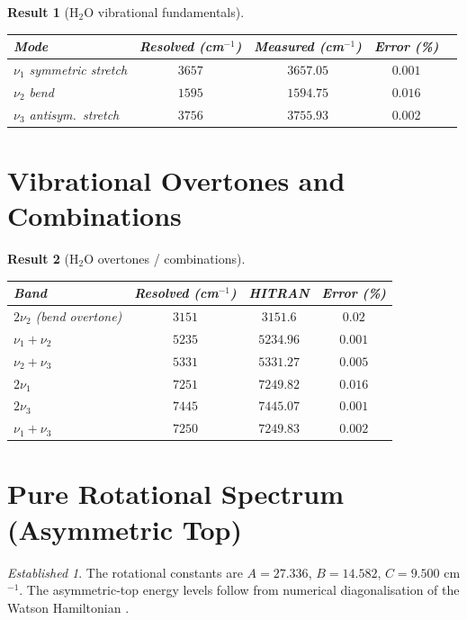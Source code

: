 \documentclass[11pt,a4paper]{article}
\theoremstyle{stmtstyle}
\newtheorem{result}{Result}
\theoremstyle{definition}
\theoremstyle{remark}
\newtheorem*{established}{Established}
\begin{document}
\begin{result}[H$_{2}$O vibrational fundamentals]\label{res:h2ovib}
\begin{center}\small
\begin{tabular}{lcccc}
\toprule
Mode & Resolved (cm$^{-1}$) & Measured (cm$^{-1}$) & Error (\%)\\
\midrule
$\nu_{1}$ symmetric stretch & $3657$ & $3657.05$ & $0.001$\\
$\nu_{2}$ bend              & $1595$ & $1594.75$ & $0.016$\\
$\nu_{3}$ antisym.\ stretch & $3756$ & $3755.93$ & $0.002$\\
\bottomrule
\end{tabular}
\end{center}
\end{result}

\section{Vibrational Overtones and Combinations}
\label{sec:h2oovertones}

\begin{result}[H$_{2}$O overtones / combinations]\label{res:h2oovertones}
\begin{center}\small
\begin{tabular}{lccc}
\toprule
Band & Resolved (cm$^{-1}$) & HITRAN \citep{hitran2020} & Error (\%)\\
\midrule
$2\nu_{2}$ (bend overtone)  & $3151$ & $3151.6$ & $0.02$\\
$\nu_{1}+\nu_{2}$           & $5235$ & $5234.96$& $0.001$\\
$\nu_{2}+\nu_{3}$           & $5331$ & $5331.27$& $0.005$\\
$2\nu_{1}$                  & $7251$ & $7249.82$& $0.016$\\
$2\nu_{3}$                  & $7445$ & $7445.07$& $0.001$\\
$\nu_{1}+\nu_{3}$           & $7250$ & $7249.83$& $0.002$\\
\bottomrule
\end{tabular}
\end{center}
\end{result}

\section{Pure Rotational Spectrum (Asymmetric Top)}
\label{sec:h2orot}

\begin{established}
The rotational constants are $A = 27.336$, $B = 14.582$, $C = 9.500$ cm$^{-1}$. The asymmetric-top energy levels follow from numerical diagonalisation of the Watson Hamiltonian \citep{watson1968}.
\end{established}
\end{document}
